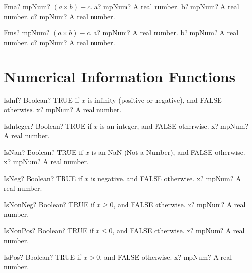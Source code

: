 \documentclass[12pt,a4paper,openany]{book}
\begin{document}
\begin{mpFunctionsExtract}
\mpFunctionThree
{Fma? mpNum? $(a \times b) + c$.}
{a? mpNum? A real number.}
{b? mpNum? A real number.}
{c? mpNum? A real number.}
\end{mpFunctionsExtract}

\begin{mpFunctionsExtract}
\mpFunctionThree
{Fms? mpNum? $(a \times b) - c$.}
{a? mpNum? A real number.}
{b? mpNum? A real number.}
{c? mpNum? A real number.}
\end{mpFunctionsExtract}

\section{Numerical Information Functions}

\begin{mpFunctionsExtract}
\mpFunctionOne
{IsInf? Boolean? TRUE if $x$ is infinity (positive or negative), and FALSE otherwise.}
{x? mpNum? A real number.}
\end{mpFunctionsExtract}

\begin{mpFunctionsExtract}
\mpFunctionOne
{IsInteger? Boolean? TRUE if $x$ is an integer, and FALSE otherwise.}
{x? mpNum? A real number.}
\end{mpFunctionsExtract}

\begin{mpFunctionsExtract}
\mpFunctionOne
{IsNan? Boolean? TRUE if $x$ is an NaN (Not a Number), and FALSE otherwise.}
{x? mpNum? A real number.}
\end{mpFunctionsExtract}

\begin{mpFunctionsExtract}
\mpFunctionOne
{IsNeg? Boolean? TRUE if $x$ is negative, and FALSE otherwise.}
{x? mpNum? A real number.}
\end{mpFunctionsExtract}

\begin{mpFunctionsExtract}
\mpFunctionOne
{IsNonNeg? Boolean? TRUE if $x \geq 0$, and FALSE otherwise.}
{x? mpNum? A real number.}
\end{mpFunctionsExtract}

\begin{mpFunctionsExtract}
\mpFunctionOne
{IsNonPos? Boolean? TRUE if $x \leq 0$, and FALSE otherwise.}
{x? mpNum? A real number.}
\end{mpFunctionsExtract}

\begin{mpFunctionsExtract}
\mpFunctionOne
{IsPos? Boolean? TRUE if $x > 0$, and FALSE otherwise.}
{x? mpNum? A real number.}
\end{mpFunctionsExtract}
\end{document}
